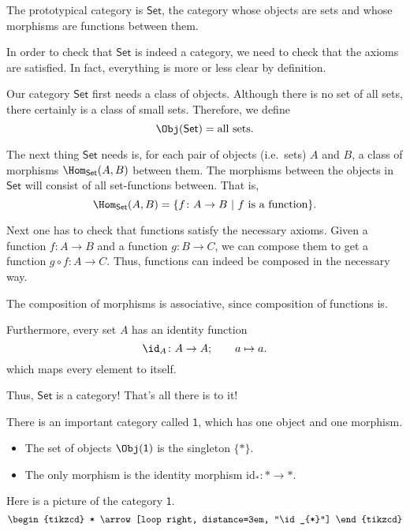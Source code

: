 \documentclass[main.tex]{subfiles}
\begin{document}
\begin{example}
  The prototypical category is $\mathsf{Set}$, the category whose objects are sets and whose morphisms are functions between them.

  In order to check that $\mathsf{Set}$ is indeed a category, we need to check that the axioms are satisfied. In fact, everything is more or less clear by definition.

  Our category $\mathsf{Set}$ first needs a class of objects. Although there is no set of all sets, there certainly is a class of small sets. Therefore, we define
  \begin{equation*}
    \Obj(\mathsf{Set}) = \text{all sets}.
  \end{equation*}

  The next thing $\mathsf{Set}$ needs is, for each pair of objects (i.e.\ sets) $A$ and $B$, a class of morphisms $\Hom_{\mathsf{Set}}(A, B)$ between them. The morphisms between the objects in $\mathsf{Set}$ will consist of all set-functions between. That is,
  \begin{equation*}
    \Hom_{\mathsf{Set}}(A, B) = \{f\colon A \to B\ |\ f\ \text{is a function}\}.
  \end{equation*}

  Next one has to check that functions satisfy the necessary axioms. Given a function $f\colon A \to B$ and a function $g\colon B \to C$, we can compose them to get a function $g \circ f\colon A \to C$. Thus, functions can indeed be composed in the necessary way.

  The composition of morphisms is associative, since composition of functions is.

  Furthermore, every set $A$ has an identity function
  \begin{equation*}
    \id_{A}\colon A \to A;\qquad a \mapsto a.
  \end{equation*}
  which maps every element to itself.

  Thus, $\mathsf{Set}$ is a category! That's all there is to it!
\end{example}

\begin{example}
  \label{eg:categorywithoneobject}
  There is an important category called $\mathsf{1}$, which has one object and one morphism.
  \begin{itemize}
    \item The set of objects $\Obj(\mathsf{1})$ is the singleton $\{*\}$.

    \item The only morphism is the identity morphism $\mathrm{id}_{*}\colon * \to *$.
  \end{itemize}

  Here is a picture of the category $\mathsf{1}$.
  \begin{equation*}
    \begin{tikzcd}
      *
      \arrow[loop right, distance=3em, "\id_{*}"]
    \end{tikzcd}
  \end{equation*}
\end{example}
\end{document}

